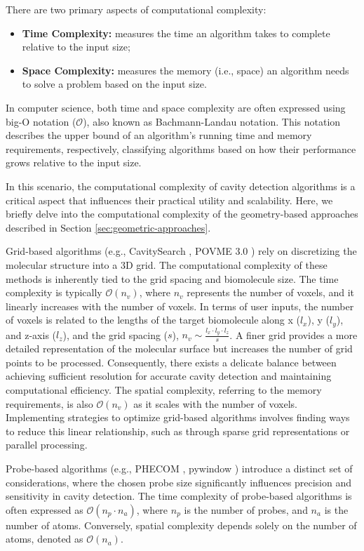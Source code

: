 \documentclass[Ingles]{phdthesis}
\def\ie{i.e.\onedot}
\def\eg{e.g.\onedot}
\begin{document}
There are two primary aspects of computational complexity:

\begin{itemize}
  \item \textbf{Time Complexity:} measures the time an algorithm takes to complete relative to the input size;
  \item \textbf{Space Complexity:} measures the memory (\ie, space) an algorithm needs to solve a problem based on the input size.
\end{itemize}

In computer science, both time and space complexity are often expressed using big-O notation ($\mathcal{O}$), also known as Bachmann-Landau notation. This notation describes the upper bound of an algorithm's running time and memory requirements, respectively, classifying algorithms based on how their performance grows relative to the input size.

In this scenario, the computational complexity of cavity detection algorithms is a
critical aspect that influences their practical utility and scalability. Here, we briefly delve into the computational complexity of the geometry-based approaches described in Section \ref{sec:geometric-approaches}.

Grid-based algorithms (\eg, CavitySearch \cite{cavitysearch}, POVME 3.0 \cite{povme}) rely on discretizing the molecular structure into a 3D grid. The computational complexity of these methods is inherently tied to the grid spacing and biomolecule size. The time complexity is typically $\mathcal{O}(n_{v})$, where $n_{v}$ represents the number of voxels, and it linearly increases with the number of voxels. In terms of user inputs, the number of voxels is related to the lengths of the target biomolecule along x ($l_x$), y ($l_y$), and z-axis ($l_z$), and the grid spacing ($s$), $ n_v \sim \frac{l_x \cdot l_y \cdot l_z}{s}$. A finer grid provides a more detailed representation of the molecular surface but increases the number of grid points to be processed. Consequently, there exists a delicate balance between achieving sufficient resolution for accurate cavity detection and maintaining computational efficiency. The spatial complexity, referring to the memory requirements, is also $\mathcal{O}(n_{v})$ as it scales with the number of voxels. Implementing strategies to optimize grid-based algorithms involves finding ways to reduce this linear relationship, such as through sparse grid representations or parallel processing.

Probe-based algorithms (\eg, PHECOM \cite{phecom}, pywindow \cite{pywindow}) introduce a distinct set of considerations, where the chosen probe size significantly influences precision and sensitivity in cavity detection. The time complexity of probe-based algorithms is often expressed as $\mathcal{O}(n_{p} \cdot n_{a})$, where $n_{p}$ is the number of probes, and $n_{a}$ is the number of atoms. Conversely, spatial complexity depends solely on the number of atoms, denoted as $\mathcal{O}(n_{a})$.
\end{document}
